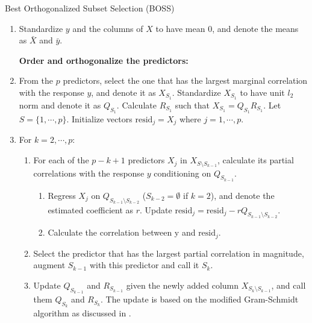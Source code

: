 \begin{algorithm}
	\caption{Best Orthogonalized Subset Selection (BOSS)}\label{alg:boss}
	\begin{enumerate}[label=\arabic*.]
		\item Standardize $y$ and the columns of $X$ to have mean $0$, and denote the means as $\bar{X}$ and $\bar{y}$.

		\textbf{Order and orthogonalize the predictors:}

		\item From the $p$ predictors, select the one that has the largest marginal correlation with the response $y$,  and denote it as $X_{S_1}$. Standardize $X_{S_1}$ to have unit $l_2$ norm and denote it as $Q_{S_1}$. Calculate $R_{S_1}$ such that $X_{S_1} = Q_{S_1} R_{S_1}$. Let $S=\{1,\cdots, p\}$. Initialize vectors $\text{resid}_j=X_j$ where $j=1,\cdots,p$.
		\item For $k=2,\cdots,p$:
		\begin{enumerate}[label=\alph*.]
			\item For each of the $p-k+1$ predictors $X_j$ in $X_{S \setminus S_{k-1} }$, calculate its partial correlations with the response $y$ conditioning on $Q_{S_{k-1}}$. 

			\begin{enumerate}[label=a\arabic*.]
				\item Regress $X_j$ on $Q_{S_{k-1} \setminus S_{k-2}}$ ($S_{k-2}=\emptyset$ if $k=2$), and denote the estimated coefficient as $r$. Update $\text{resid}_j = \text{resid}_j - r Q_{S_{k-1} \setminus S_{k-2}}$.
				\item Calculate the correlation between y and $\text{resid}_j$.
			\end{enumerate}
			\item Select the predictor that has the largest partial correlation in magnitude, augment $S_{k-1}$ with this predictor and call it $S_{k}$.
			\item Update $Q_{S_{k-1}}$ and $R_{S_{k-1}}$ given the newly added column $X_{S_k \setminus S_{k-1}}$, and call them $Q_{S_k}$ and $R_{S_k}$. The update is based on the modified Gram-Schmidt algorithm as discussed in \citet{hammarling2008updating}.
		\end{enumerate}
		

\end{enumerate}
\end{algorithm}
